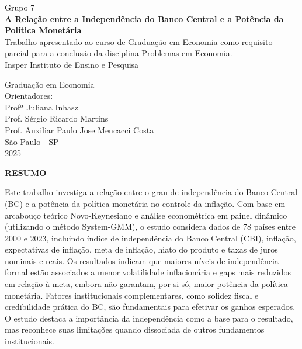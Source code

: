 \documentclass[a4paper,12pt]{article}
\begin{document}
\newpage
\begin{titlepage}
    \begin{center}
        {\large Grupo 7}\\[10cm]
        
        {\Large \textbf{A Relação entre a Independência do Banco Central e a Potência da Política Monetária}}\\[1cm]
        
        {\large Trabalho apresentado ao curso de Graduação em Economia como requisito parcial para a conclusão da disciplina Problemas em Economia.}\\[2cm]
        
        {\large Insper Instituto de Ensino e Pesquisa}\\
        \vfill
        
        {\large Graduação em Economia}\\
        
        {\large Orientadores:}\\ 
        Profª Juliana Inhasz\\
        Prof. Sérgio Ricardo Martins\\
        Prof. Auxiliar Paulo Jose Mencacci Costa\\[2cm]

        
        
        São Paulo - SP\\
        2025
    \end{center}
\end{titlepage}


\newpage
\thispagestyle{empty} %

\begin{center}
    \textbf{RESUMO}
\end{center}

\vspace{1em}

\noindent
Este trabalho investiga a relação entre o grau de independência do Banco Central (BC) e a potência da política monetária no controle da inflação. Com base em arcabouço teórico Novo-Keynesiano e análise econométrica em painel dinâmico (utilizando o método System-GMM), o estudo considera dados de 78 países entre 2000 e 2023, incluindo índice de independência do Banco Central (CBI), inflação, expectativas de inflação, meta de inflação, hiato do produto e taxas de juros nominais e reais. Os resultados indicam que maiores níveis de independência formal estão associados a menor volatilidade inflacionária e gaps mais reduzidos em relação à meta, embora não garantam, por si só, maior potência da política monetária. Fatores institucionais complementares, como solidez fiscal e credibilidade prática do BC, são fundamentais para efetivar os ganhos esperados. O estudo destaca a importância da independência como a base para o resultado, mas reconhece suas limitações quando dissociada de outros fundamentos institucionais.
\end{document}
